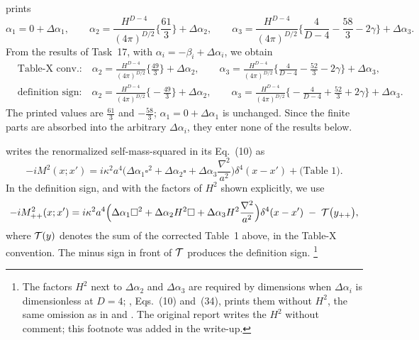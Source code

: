 \PII{} prints \tP
\begin{equation*}
\alpha_1=0+\Delta\alpha_1,\qquad
\alpha_2=\frac{H^{D-4}}{(4\pi)^{D/2}}\Big\{\frac{61}{3}\Big\}+\Delta\alpha_2,\qquad
\alpha_3=\frac{H^{D-4}}{(4\pi)^{D/2}}\Big\{\frac{4}{D-4}-\frac{58}{3}-2\gamma\Big\}+\Delta\alpha_3 .
\end{equation*}
From the results of Task~17, with $\alpha_i=-\beta_i+\Delta\alpha_i$, we obtain \tD
\begin{equation}
\begin{aligned}
&\text{Table-X conv.:}\quad \alpha_2=\tfrac{H^{D-4}}{(4\pi)^{D/2}}\Big\{\tfrac{49}{3}\Big\}+\Delta\alpha_2,\qquad
\alpha_3=\tfrac{H^{D-4}}{(4\pi)^{D/2}}\Big\{\tfrac4{D-4}-\tfrac{52}3-2\gamma\Big\}+\Delta\alpha_3,\\
&\text{definition sign:}\quad \alpha_2=\tfrac{H^{D-4}}{(4\pi)^{D/2}}\Big\{-\tfrac{49}{3}\Big\}+\Delta\alpha_2,\qquad
\alpha_3=\tfrac{H^{D-4}}{(4\pi)^{D/2}}\Big\{-\tfrac4{D-4}+\tfrac{52}3+2\gamma\Big\}+\Delta\alpha_3 .
\end{aligned}
\label{eq:ch09-alpha}
\end{equation}
The printed values are $\tfrac{61}3$ and $-\tfrac{58}3$; $\alpha_1=0+\Delta\alpha_1$ is unchanged. Since the finite parts are absorbed into the arbitrary $\Delta\alpha_i$,
they enter none of the results below.

\PII{} writes the renormalized self-mass-squared in its Eq.~(10) as \tP
\begin{equation*}
-iM^2(x;x')=i\kappa^2a^4\Big(\Delta\alpha_1\square^2+\Delta\alpha_2\square+\Delta\alpha_3\frac{\nabla^2}{a^2}\Big)\delta^4(x-x')+\Big(\text{Table 1}\Big).
\end{equation*}
In the definition sign, and with the factors of $H^2$ shown explicitly, we use \tD
\begin{equation}
-iM^2_{++}(x;x')=i\kappa^2a^4\Big(\Delta\alpha_1\square^2+\Delta\alpha_2H^2\square+\Delta\alpha_3H^2\frac{\nabla^2}{a^2}\Big)\delta^4(x-x')\;-\;\mathcal{T}\big(y_{++}\big),
\label{eq:ch09-Mpp}
\end{equation}
where $\mathcal{T}(y)$ denotes the sum of the corrected Table~1 above, in the Table-X convention. The minus sign in front of $\mathcal{T}$ produces the definition sign.%
\footnote{The factors $H^2$ next to $\Delta\alpha_2$ and $\Delta\alpha_3$ are required by dimensions when $\Delta\alpha_i$ is dimensionless at $D=4$; \PII, Eqs.~(10) and~(34),
prints them without $H^2$, the same omission as in  and . The original report writes the $H^2$ without comment; this footnote was added in the write-up.}

